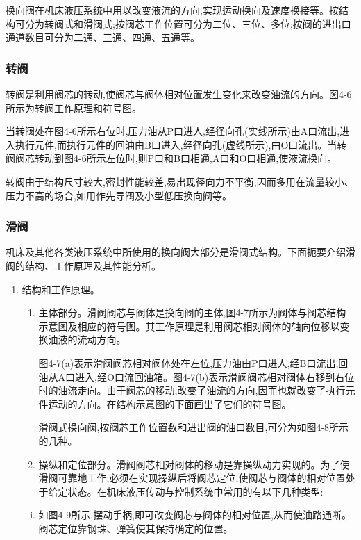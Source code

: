 换向阀在机床液压系统中用以改变液流的方向,实现运动换向及速度换接等。按结构可分为转阀式和滑阀式;按阀芯工作位置可分为二位、三位、多位;按阀的进出口通道数目可分为二通、三通、四通、五通等。

\subsubsection{转阀}

转阀是利用阀芯的转动,使阀芯与阀体相对位置发生变化来改变油流的方向。图4-6所示为转阀工作原理和符号图。

当转阀处在图4-6所示右位时,压力油从P口进人,经径向孔(实线所示)由A口流出,进入执行元件,而执行元件的回油由B口进入,经径向孔(虚线所示),由O口流出。当转阀阀芯转动到图4-6所示左位时,则P口和B口相通,A口和O口相通,使液流换向。

转阀由于结构尺寸较大,密封性能较差,易出现径向力不平衡,因而多用在流量较小、压力不高的场合,如用作先导阀及小型低压换向阀等。

\subsubsection{滑阀}

机床及其他各类液压系统中所使用的换向阀大部分是滑阀式结构。下面扼要介绍滑阀的结构、工作原理及其性能分析。

\begin{enumerate}[(1)]
\item 结构和工作原理。

\begin{enumerate}[1)]
\item 主体部分。滑阀阀芯与阀体是换向阀的主体,图4-7所示为阀体与阀芯结构示意图及相应的符号图。其工作原理是利用阀芯相对阀体的轴向位移以变换油液的流动方向。

图4-7(a)表示滑阀阀芯相对阀体处在左位,压力油由P口进人,经B口流出,回油从A口进入,经O口流回油箱。图4-7(b)表示滑阀阀芯相对阀体右移到右位时的油流走向。由于阀芯的移动,改变了油流的方向,因而也就改变了执行元件运动的方向。在结构示意图的下面画出了它们的符号图。

滑阀式换向阀,按阀芯工作位置数和进出阀的油口数目,可分为如图4-8所示的几种。

\item 操纵和定位部分。滑阀阀芯相对阀体的移动是靠操纵动力实现的。为了使滑阀可靠地工作,必须在实现操纵后将阀芯定位,使阀芯与阀体的相对位置处于给定状态。在机床液压传动与控制系统中常用的有以下几种类型:
\end{enumerate}

\begin{enumerate}[(i)]
\item 如图4-9所示,摆动手柄,即可改变阀芯与阀体的相对位置,从而使油路通断。阀芯定位靠钢珠、弹簧使其保持确定的位置。
\end{enumerate}
\end{enumerate}
